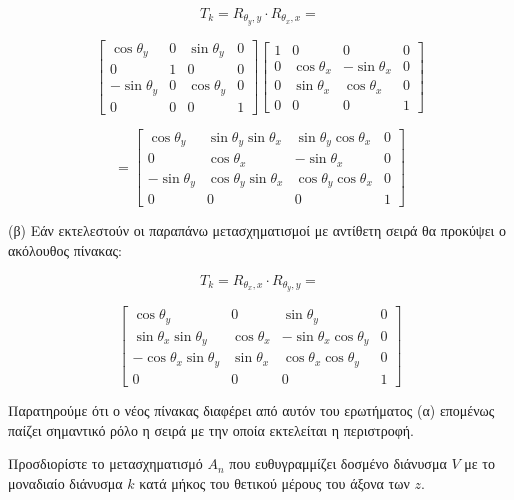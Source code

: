 
\[
T_k = R_{\theta_y, y} \cdot R_{\theta_x, x} =
\]

\[
\begin{bmatrix}
\cos \theta_y & 0 & \sin \theta_y & 0 \\
0 & 1 & 0 & 0 \\
-\sin \theta_y & 0 & \cos \theta_y & 0 \\
0 & 0 & 0 & 1
\end{bmatrix}
\begin{bmatrix}
1 & 0 & 0 & 0 \\
0 & \cos \theta_x & -\sin \theta_x & 0 \\
0 & \sin \theta_x & \cos \theta_x & 0 \\
0 & 0 & 0 & 1
\end{bmatrix}
\]

\[
= 
\begin{bmatrix}
\cos \theta_y & \sin \theta_y \sin \theta_x & \sin \theta_y \cos \theta_x & 0 \\
0 & \cos \theta_x & -\sin \theta_x & 0 \\
-\sin \theta_y & \cos \theta_y \sin \theta_x & \cos \theta_y \cos \theta_x & 0 \\
0 & 0 & 0 & 1
\end{bmatrix}
\]

(β) Εάν εκτελεστούν οι παραπάνω μετασχηματισμοί με αντίθετη σειρά θα προκύψει ο ακόλουθος πίνακας:

\[
T_k = R_{\theta_x, x} \cdot R_{\theta_y, y} =
\]

\[
\begin{bmatrix}
\cos \theta_y & 0 & \sin \theta_y & 0 \\
\sin \theta_x \sin \theta_y & \cos \theta_x & -\sin \theta_x \cos \theta_y & 0 \\
-\cos \theta_x \sin \theta_y & \sin \theta_x & \cos \theta_x \cos \theta_y & 0 \\
0 & 0 & 0 & 1
\end{bmatrix}
\]

Παρατηρούμε ότι ο νέος πίνακας διαφέρει από αυτόν του ερωτήματος (α) επομένως παίζει σημαντικό ρόλο η σειρά με την οποία εκτελείται η περιστροφή.

\begin{example}
Προσδιορίστε το μετασχηματισμό \( A_n \) που ευθυγραμμίζει δοσμένο διάνυσμα \( V \) με το μοναδιαίο διάνυσμα \( k \) κατά μήκος του θετικού μέρους του άξονα των \( z \).

\end{example}
